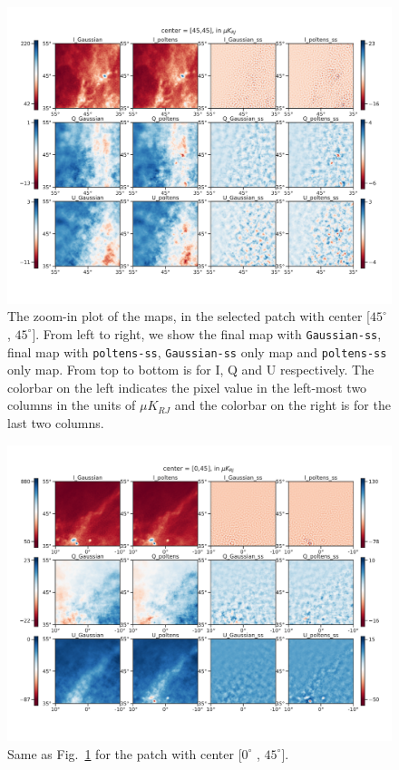 \documentclass[twocolumn]{aastex631}
\begin{document}
\begin{figure}[hbt]
    \centering
    \includegraphics[width=180mm]{maps_patch2.pdf}
    \caption{The zoom-in plot of the maps, in the selected patch with center [$45^{\circ}$ , $45^{\circ} $]. From left to right, we show the final map with \texttt{Gaussian-ss}, final map with \texttt{poltens-ss}, \texttt{Gaussian-ss} only map and \texttt{poltens-ss} only map. From top to bottom is for I, Q and U respectively. The colorbar on the left indicates the pixel value in the left-most two columns in the units of $\mu K_{RJ}$ and the colorbar on the right is for the last two columns. }
    \label{fig:maps:patch2}
\end{figure}

\begin{figure}[hbt]
    \centering
    \includegraphics[width=180mm]{maps_patch1.pdf}
    \caption{Same as Fig.~\ref{fig:maps:patch2} for the patch with center [$0^{\circ}$ , $45^{\circ} $].}
    \label{fig:maps:patch1}
\end{figure}
\end{document}
